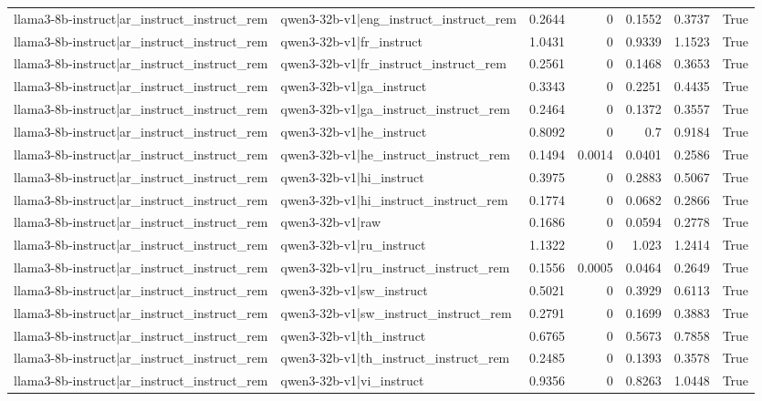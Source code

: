 \begin{table}
\begin{tabular}{l l r r r r l}
llama3-8b-instruct|ar_instruct_instruct_rem & qwen3-32b-v1|eng_instruct_instruct_rem & 0.2644 & 0 & 0.1552 & 0.3737 & True \\
llama3-8b-instruct|ar_instruct_instruct_rem & qwen3-32b-v1|fr_instruct & 1.0431 & 0 & 0.9339 & 1.1523 & True \\
llama3-8b-instruct|ar_instruct_instruct_rem & qwen3-32b-v1|fr_instruct_instruct_rem & 0.2561 & 0 & 0.1468 & 0.3653 & True \\
llama3-8b-instruct|ar_instruct_instruct_rem & qwen3-32b-v1|ga_instruct & 0.3343 & 0 & 0.2251 & 0.4435 & True \\
llama3-8b-instruct|ar_instruct_instruct_rem & qwen3-32b-v1|ga_instruct_instruct_rem & 0.2464 & 0 & 0.1372 & 0.3557 & True \\
llama3-8b-instruct|ar_instruct_instruct_rem & qwen3-32b-v1|he_instruct & 0.8092 & 0 & 0.7 & 0.9184 & True \\
llama3-8b-instruct|ar_instruct_instruct_rem & qwen3-32b-v1|he_instruct_instruct_rem & 0.1494 & 0.0014 & 0.0401 & 0.2586 & True \\
llama3-8b-instruct|ar_instruct_instruct_rem & qwen3-32b-v1|hi_instruct & 0.3975 & 0 & 0.2883 & 0.5067 & True \\
llama3-8b-instruct|ar_instruct_instruct_rem & qwen3-32b-v1|hi_instruct_instruct_rem & 0.1774 & 0 & 0.0682 & 0.2866 & True \\
llama3-8b-instruct|ar_instruct_instruct_rem & qwen3-32b-v1|raw & 0.1686 & 0 & 0.0594 & 0.2778 & True \\
llama3-8b-instruct|ar_instruct_instruct_rem & qwen3-32b-v1|ru_instruct & 1.1322 & 0 & 1.023 & 1.2414 & True \\
llama3-8b-instruct|ar_instruct_instruct_rem & qwen3-32b-v1|ru_instruct_instruct_rem & 0.1556 & 0.0005 & 0.0464 & 0.2649 & True \\
llama3-8b-instruct|ar_instruct_instruct_rem & qwen3-32b-v1|sw_instruct & 0.5021 & 0 & 0.3929 & 0.6113 & True \\
llama3-8b-instruct|ar_instruct_instruct_rem & qwen3-32b-v1|sw_instruct_instruct_rem & 0.2791 & 0 & 0.1699 & 0.3883 & True \\
llama3-8b-instruct|ar_instruct_instruct_rem & qwen3-32b-v1|th_instruct & 0.6765 & 0 & 0.5673 & 0.7858 & True \\
llama3-8b-instruct|ar_instruct_instruct_rem & qwen3-32b-v1|th_instruct_instruct_rem & 0.2485 & 0 & 0.1393 & 0.3578 & True \\
llama3-8b-instruct|ar_instruct_instruct_rem & qwen3-32b-v1|vi_instruct & 0.9356 & 0 & 0.8263 & 1.0448 & True \\

\end{tabular}
\end{table}
